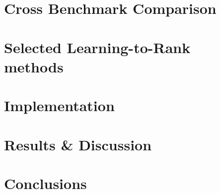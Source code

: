 \chapter{Cross Benchmark Comparison}

\chapter{Selected Learning-to-Rank methods}

\chapter{Implementation}

\chapter{Results \& Discussion}

\chapter{Conclusions}

\cleardoublepage
\appendix







\cleardoublepage
\cleardoublepage

